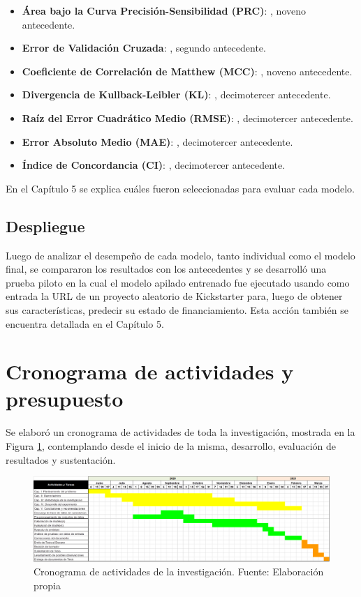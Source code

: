 \begin{itemize}
	\item \textbf{Área bajo la Curva Precisión-Sensibilidad (PRC)}: \citeauthor{pr_kaur2017socmedcrowd}, noveno antecedente.
	\item \textbf{Error de Validación Cruzada}: \citeauthor{pr_mitra2014phrases}, segundo antecedente.
	\item \textbf{Coeficiente de Correlación de Matthew (MCC)}: \citeauthor{pr_kaur2017socmedcrowd}, noveno antecedente.
	\item \textbf{Divergencia de Kullback-Leibler (KL)}: \citeauthor{pr_jin2019dayssuccess}, decimotercer antecedente.
	\item \textbf{Raíz del Error Cuadrático Medio (RMSE)}: \citeauthor{pr_jin2019dayssuccess}, decimotercer antecedente.
	\item \textbf{Error Absoluto Medio (MAE)}: \citeauthor{pr_jin2019dayssuccess}, decimotercer antecedente.
	\item \textbf{Índice de Concordancia (CI)}: \citeauthor{pr_jin2019dayssuccess}, decimotercer antecedente.
\end{itemize}

En el Capítulo 5 se explica cuáles fueron seleccionadas para evaluar cada modelo.

\subsection{Despliegue}
Luego de analizar el desempeño de cada modelo, tanto individual como el modelo final, se compararon los resultados con los antecedentes y se desarrolló una prueba piloto en la cual el modelo apilado entrenado fue ejecutado usando como entrada la URL de un proyecto aleatorio de Kickstarter para, luego de obtener sus características, predecir su estado de financiamiento. Esta acción también se encuentra detallada en el Capítulo 5.

\section{Cronograma de actividades y presupuesto}
Se elaboró un cronograma de actividades de toda la investigación, mostrada en la Figura \ref{3:fig5}, contemplando desde el inicio de la misma, desarrollo, evaluación de resultados y sustentación.
\begin{figure}[h]
	\begin{center}
		\includegraphics[width=1.1\textwidth]{3/figures/cronograma.png}
		\caption{Cronograma de actividades de la investigación. Fuente: Elaboración propia}
		\label{3:fig5}
	\end{center}
\end{figure}

